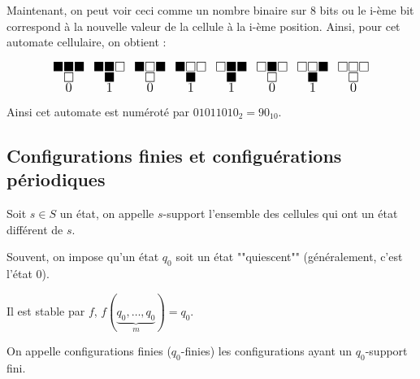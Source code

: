 \begin{notation}
	Maintenant, on peut voir ceci comme un nombre binaire sur 8 bits ou le i-ème bit correspond à la
	nouvelle valeur de la cellule à la i-ème position. Ainsi, pour cet automate cellulaire, on obtient :


	\[ \LARGE
		\substack{\blacksquare \blacksquare \blacksquare \\ \square \\ 0 } \enspace
		\substack{\blacksquare \blacksquare \square \\ \blacksquare \\ 1} \enspace
		\substack{\blacksquare \square \blacksquare \\ \square \\ 0} \enspace
		\substack{\blacksquare \square \square \\ \blacksquare \\ 1} \enspace
		\substack{\square \blacksquare \blacksquare \\ \blacksquare \\ 1} \enspace
		\substack{\square \blacksquare \square \\ \square \\ 0} \enspace
		\substack{\square \square \blacksquare \\ \blacksquare \\ 1} \enspace
		\substack{\square \square \square \\ \square \\ 0}
	\]

	Ainsi cet automate est numéroté par $01011010_2 = 90_{10}$.
\end{notation}

\subsection{Configurations finies et configuérations périodiques}

\begin{definition}
	Soit $s \in S$ un état, on appelle $s$-support l'ensemble des cellules qui ont
	un état différent de $s$.
\end{definition}

\begin{notation}
	Souvent, on impose qu'un état $q_0$ soit un état ""quiescent"" (généralement, c'est l'état 0).

	Il est stable par $f$, \ie $f(\underbrace{q_0,\ldots, q_0}_m) = q_0$.
\end{notation}

\begin{definition}
	On appelle configurations finies ($q_0$-finies) les configurations ayant un $q_0$-support fini.
\end{definition}


